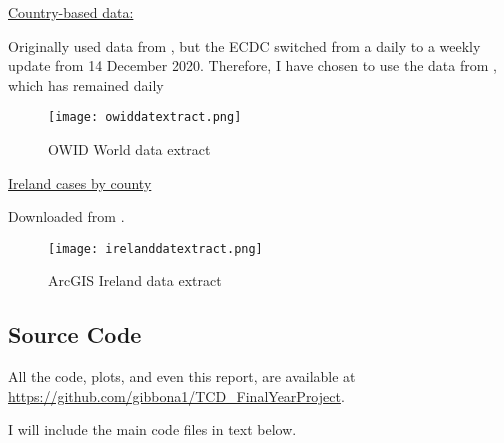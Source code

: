 \underline{Country-based data:}

Originally used data from \cite{ecdcdata},  but the ECDC switched from a daily to a weekly update from 14 December 2020. Therefore, I have chosen to use the data from  \cite{countrydata}, which has remained daily

\begin{figure}[H]
  \texttt{[image: owiddatextract.png]} \label{fig:owiddatextract}
\endminipage
\caption{OWID World data extract}
\end{figure}

\underline{Ireland cases by county}

Downloaded from \cite{irelanddata}.

\begin{figure}[H]
  \texttt{[image: irelanddatextract.png]} \label{fig:irelanddatextract}
\endminipage
\caption{ArcGIS Ireland data extract}
\end{figure}


\subsection{Source Code}

All the code, plots, and even this report, are available at \url{https://github.com/gibbona1/TCD_FinalYearProject}. 

I will include the main code files in text below.













